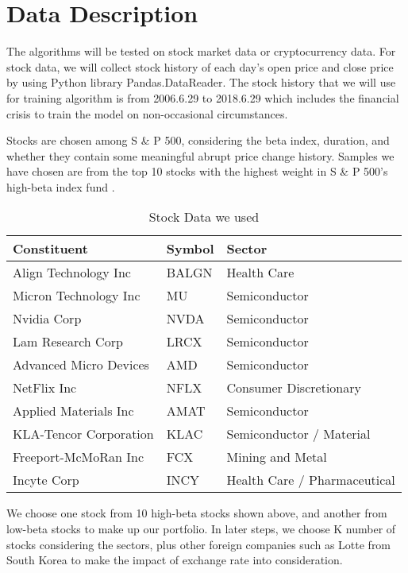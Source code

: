 \chapter{Data Description}
\label{Ch:figures}

The algorithms will be tested on stock market data or cryptocurrency data. For stock data, we will collect stock history of each day’s open price and close price by using Python library Pandas.DataReader. The stock history that we will use for training algorithm is from  2006.6.29 to 2018.6.29 which includes the financial crisis to train the model on non-occasional circumstances. 

Stocks are chosen among S \& P 500, considering the beta index, duration, and whether they contain some meaningful abrupt price change history. Samples we have chosen are from the top 10 stocks with the highest weight in S \& P 500’s high-beta index fund . 
\begin{table}[h]
\begin{center}
\begin{tabular}{|p{2in}|p{1in}|p{2in}|} \hline
Constituent & Symbol & Sector \\ \hline
Align Technology Inc  & BALGN & Health Care\\ \hline
Micron Technology Inc & MU & Semiconductor  \\ \hline
Nvidia Corp & NVDA & Semiconductor  \\ \hline
Lam Research Corp & LRCX & Semiconductor  \\ \hline
Advanced Micro Devices & AMD & Semiconductor  \\ \hline
NetFlix Inc & NFLX & Consumer Discretionary \\ \hline
Applied Materials Inc & AMAT & Semiconductor \\ \hline
KLA-Tencor Corporation & KLAC & Semiconductor / Material \\ \hline
Freeport-McMoRan Inc & FCX & Mining and Metal \\ \hline
Incyte Corp & INCY & Health Care / Pharmaceutical  \\ \hline
\end{tabular}
\caption{Stock Data we used}\label{TABLE:SplitText}
\end{center}
\end{table}

We choose one stock from 10 high-beta stocks shown above, and another from low-beta stocks to make up our portfolio. In later steps, we choose K number of stocks considering the sectors, plus other foreign companies such as Lotte from South Korea to make the impact of exchange rate into consideration.

